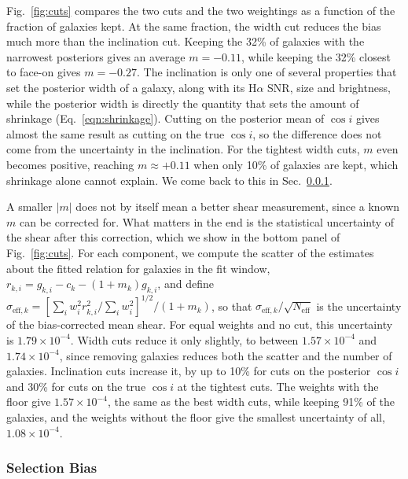 Fig.~\ref{fig:cuts} compares the two cuts and the two weightings as a function of the fraction of galaxies kept. At the same fraction, the width cut reduces the bias much more than the inclination cut. Keeping the 32\% of galaxies with the narrowest posteriors gives an average $m = -0.11$, while keeping the 32\% closest to face-on gives $m = -0.27$. The inclination is only one of several properties that set the posterior width of a galaxy, along with its H$\alpha$ SNR, size and brightness, while the posterior width is directly the quantity that sets the amount of shrinkage (Eq.~\ref{eqn:shrinkage}). Cutting on the posterior mean of $\cos i$ gives almost the same result as cutting on the true $\cos i$, so the difference does not come from the uncertainty in the inclination. For the tightest width cuts, $m$ even becomes positive, reaching $m \approx +0.11$ when only 10\% of galaxies are kept, which shrinkage alone cannot explain. We come back to this in Sec.~\ref{sssec:selection}.

A smaller $|m|$ does not by itself mean a better shear measurement, since a known $m$ can be corrected for. What matters in the end is the statistical uncertainty of the shear after this correction, which we show in the bottom panel of Fig.~\ref{fig:cuts}. For each component, we compute the scatter of the estimates about the fitted relation for galaxies in the fit window, $r_{k,i} = \hat{g}_{k,i} - c_k - (1+m_k) g_{k,i}$, and define $\sigma_{\mathrm{eff},k} = [\sum_i w_i^2 r_{k,i}^2/\sum_i w_i^2]^{1/2}/(1+m_k)$, so that $\sigma_{\mathrm{eff},k}/\sqrt{N_\mathrm{eff}}$ is the uncertainty of the bias-corrected mean shear. For equal weights and no cut, this uncertainty is $1.79\times10^{-4}$. Width cuts reduce it only slightly, to between $1.57\times10^{-4}$ and $1.74\times10^{-4}$, since removing galaxies reduces both the scatter and the number of galaxies. Inclination cuts increase it, by up to 10\% for cuts on the posterior $\cos i$ and 30\% for cuts on the true $\cos i$ at the tightest cuts. The weights with the floor give $1.57\times10^{-4}$, the same as the best width cuts, while keeping 91\% of the galaxies, and the weights without the floor give the smallest uncertainty of all, $1.08\times10^{-4}$. 

\subsubsection{Selection Bias}
\label{sssec:selection}

